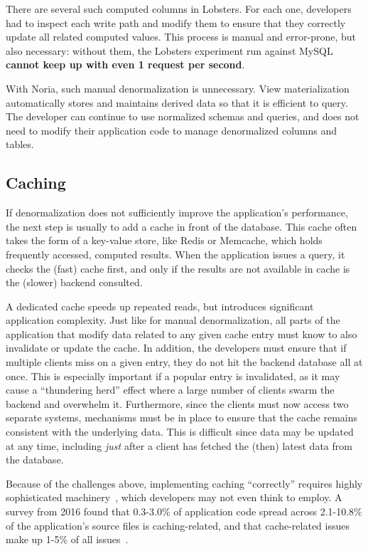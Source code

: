 There are several such computed columns in Lobsters. For each one, developers
had to inspect each write path and modify them to ensure that they correctly
update all related computed values. This process is manual and error-prone, but
also necessary: without them, the Lobsters experiment run against MySQL
\textbf{cannot keep up with even 1 request per second}.

With Noria, such manual denormalization is unnecessary. View materialization
automatically stores and maintains derived data so that it is efficient to
query. The developer can continue to use normalized schemas and queries, and
does not need to modify their application code to manage denormalized columns
and tables.

\subsection{Caching}

If denormalization does not sufficiently improve the application's performance,
the next step is usually to add a cache in front of the database. This cache
often takes the form of a key-value store, like Redis or Memcache, which holds
frequently accessed, computed results. When the application issues a query, it
checks the (fast) cache first, and only if the results are not available in
cache is the (slower) backend consulted.

A dedicated cache speeds up repeated reads, but introduces significant
application complexity. Just like for manual denormalization, all parts of the
application that modify data related to any given cache entry must know to also
invalidate or update the cache. In addition, the developers must ensure
that if multiple clients miss on a given entry, they do not hit the backend
database all at once. This is especially important if a popular entry is
invalidated, as it may cause a ``thundering herd'' effect where a large number
of clients swarm the backend and overwhelm it. Furthermore, since the clients
must now access two separate systems, mechanisms must be in place to ensure that
the cache remains consistent with the underlying data. This is difficult since
data may be updated at any time, including \emph{just} after a client has
fetched the (then) latest data from the database.

Because of the challenges above, implementing caching ``correctly'' requires
highly sophisticated machinery~\cite{facebook-memcache, transactional-cache,
orm-cache, sql-cache}, which developers may not even think to employ. A survey
from 2016 found that 0.3-3.0\% of application code spread across 2.1-10.8\% of
the application's source files is caching-related, and that cache-related issues
make up 1-5\% of all issues~\cite{caching-is-hard}.

